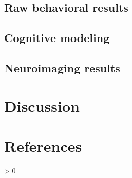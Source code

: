 \documentclass[
  english,
  man]{apa6}
\newlength{\cslhangindent}
\newenvironment{CSLReferences}[2] %
 {%
  \setlength{\parindent}{0pt}
  \ifodd #1 \everypar{\setlength{\hangindent}{\cslhangindent}}\ignorespaces\fi
  \ifnum #2 > 0
  \setlength{\parskip}{#2\baselineskip}
  \fi
 }%
 {}
\begin{document}
\hypertarget{raw-behavioral-results}{%
\subsection{Raw behavioral results}\label{raw-behavioral-results}}

\hypertarget{cognitive-modeling}{%
\subsection{Cognitive modeling}\label{cognitive-modeling}}

\hypertarget{neuroimaging-results}{%
\subsection{Neuroimaging results}\label{neuroimaging-results}}

\hypertarget{discussion}{%
\section{Discussion}\label{discussion}}

\newpage

\hypertarget{references}{%
\section{References}\label{references}}

\begingroup
\setlength{\parindent}{-0.5in}
\setlength{\leftskip}{0.5in}

\hypertarget{refs}{}
\begin{CSLReferences}{0}{0}
\end{CSLReferences}

\endgroup
\end{document}
